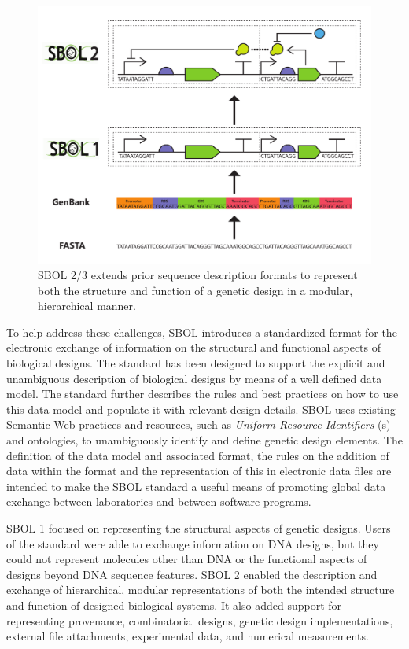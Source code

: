 \begin{figure}[htbp]
\centering
\includegraphics[width=\textwidth]{images/standard-evolution.pdf}
\caption{SBOL 2/3 extends prior sequence description formats to represent both the structure and function of a genetic design in a modular, hierarchical manner.}
\label{f:sequence}
\end{figure}

To help address these challenges, SBOL introduces a standardized format for the electronic exchange of information on the structural and functional aspects of biological designs. 
The standard has been designed to support the explicit and unambiguous description of biological designs by means of a well defined data model. 
The standard further describes the rules and best practices on how to use this data model and populate it with relevant design details. 
SBOL uses existing Semantic Web practices and resources, such as \emph{Uniform Resource Identifiers} (s) and ontologies, to unambiguously identify and define genetic design elements.
The definition of the data model and associated format, the rules on the addition of data within the format and the representation of this in electronic data files are intended to make the SBOL standard a useful means of promoting global data exchange between laboratories and between software programs.

SBOL 1 focused on representing the structural aspects of genetic designs. Users of the standard were able to exchange information on DNA designs, but they could not represent molecules other than DNA or the functional aspects of designs beyond DNA sequence features. SBOL 2 enabled the description and exchange of hierarchical, modular representations of both the intended structure and function of designed biological systems.  It also added support for representing provenance, combinatorial designs, genetic design implementations, external file attachments, experimental data, and numerical measurements. 

